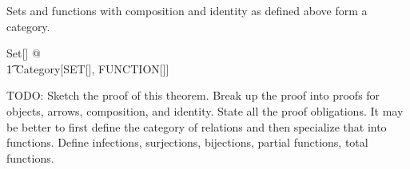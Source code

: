 \documentclass{amsart}
\begin{document}
\begin{theorem}
Sets and functions with composition and identity as defined above form a category.
\begin{zed}
	\forall Set[\setT] @ \\
	\t1	Category[SET[\setT], FUNCTION[\setT]]
\end{zed}
\end{theorem}

TODO: Sketch the proof of this theorem. Break up the proof into proofs for objects, arrows, composition, and identity.
State all the proof obligations. It may be better to first define the category of relations and then specialize that into functions.
Define infections, surjections, bijections, partial functions, total functions.

\printbibliography
\end{document}
